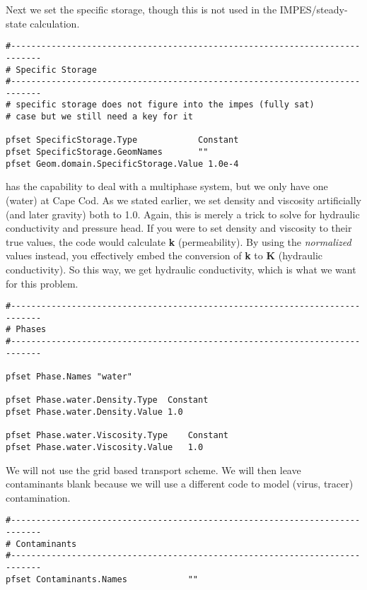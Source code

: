 Next we set the specific storage, though this is not used in the IMPES/steady-state calculation.

\begin{verbatim}
#----------------------------------------------------------------------------
# Specific Storage
#----------------------------------------------------------------------------
# specific storage does not figure into the impes (fully sat) 
# case but we still need a key for it

pfset SpecificStorage.Type            Constant
pfset SpecificStorage.GeomNames       ""
pfset Geom.domain.SpecificStorage.Value 1.0e-4
\end{verbatim}

\parflow{} has the capability to deal with a multiphase system, but we only have one (water) at Cape Cod. 
As we stated earlier, we set density and viscosity artificially (and later gravity) both to 1.0.  
Again, this is merely a trick to solve for hydraulic conductivity and pressure head.  
If you were to set density and viscosity to their true values, the code would calculate {\bf k} (permeability). 
By using the \emph{normalized} values instead, you effectively embed the conversion of {\bf k} to {\bf K} (hydraulic conductivity). 
So this way, we get hydraulic conductivity, which is what we want for this problem.

\begin{verbatim}
#----------------------------------------------------------------------------
# Phases
#----------------------------------------------------------------------------

pfset Phase.Names "water"

pfset Phase.water.Density.Type	Constant
pfset Phase.water.Density.Value	1.0

pfset Phase.water.Viscosity.Type	Constant
pfset Phase.water.Viscosity.Value	1.0
\end{verbatim}

We will not use the \parflow{} grid based transport scheme.  We will then leave 
contaminants blank because we will use a different code to model (virus, tracer) contamination.

\begin{verbatim}
#----------------------------------------------------------------------------
# Contaminants
#----------------------------------------------------------------------------
pfset Contaminants.Names			""
\end{verbatim}

